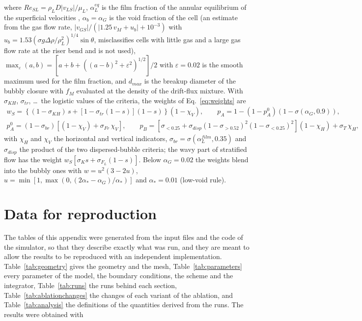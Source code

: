 \documentclass[a4paper,fleqn]{cas-sc}
\newcommand{\aG}{\alpha_G}
\newcommand{\aL}{\alpha_L}
\begin{document}
where $Re_{SL} = \rho_L D|v_{LS}|/\mu_L$, $\aL^{eq}$ is the film fraction of the annular equilibrium of the superficial velocities \citep{taitel1980,barnea1987}, $\alpha_b = \aG$ is the void fraction of the cell (an estimate from the gas flow rate, $|v_{GS}|/(|1.25\,v_M + u_b| + 10^{-3})$ with $u_b = 1.53(\sigma g\Delta\rho/\rho_L^2)^{1/4}\sin\theta$, misclassifies cells with little gas and a large gas flow rate at the riser bend and is not used), $\max_\varepsilon(a, b) = [a + b + ((a - b)^2 + \varepsilon^2)^{1/2}]/2$ with $\varepsilon = 0.02$ is the smooth maximum used for the film fraction, and $d_{max}$ is the breakup diameter of the bubbly closure with $f_M$ evaluated at the density of the drift-flux mixture. With $\sigma_{KH}$, $\sigma_{tr}$, \dots\ the logistic values of the criteria, the weights of Eq.~\eqref{eq:weights} are
\begin{gather}
w_S = \left\{(1 - \sigma_{KH})\,s + \left[1 - \sigma_{tr}(1 - s)\right](1 - s)\right\}(1 - \chi_V), \qquad p_A = 1 - (1 - p_A^0)(1 - \sigma(\aG, 0.9)), \\
p_A^0 = (1 - \sigma_{br})\left[(1 - \chi_V) + \sigma_{Fr}\,\chi_V\right], \qquad p_B = \left[\sigma_{<0.25} + \sigma_{disp}(1 - \sigma_{>0.52})^2(1 - \sigma_{<0.25})^2\right](1 - \chi_H) + \sigma_T\,\chi_H,
\end{gather}
with $\chi_H$ and $\chi_V$ the horizontal and vertical indicators, $\sigma_{br} = \sigma(\aL^{film}, 0.35)$ and $\sigma_{disp}$ the product of the two dispersed-bubble criteria; the wavy part of stratified flow has the weight $w_S[\sigma_K s + \sigma_{F_L}(1 - s)]$. Below $\aG = 0.02$ the weights blend into the bubbly ones with $w = u^2(3 - 2u)$, $u = \min[1, \max(0, (2\alpha_* - \aG)/\alpha_*)]$ and $\alpha_* = 0.01$ (low-void rule).

\section{Data for reproduction}\label{app:reproduction}
\setcounter{equation}{0}\setcounter{table}{0}\setcounter{figure}{0}

The tables of this appendix were generated from the input files and the code of the simulator, so that they describe exactly what was run, and they are meant to allow the results to be reproduced with an independent implementation. Table~\ref{tab:geometry} gives the geometry and the mesh, Table~\ref{tab:parameters} every parameter of the model, the boundary conditions, the scheme and the integrator, Table~\ref{tab:runs} the runs behind each section, Table~\ref{tab:ablationchanges} the changes of each variant of the ablation, and Table~\ref{tab:analysis} the definitions of the quantities derived from the runs. The results were obtained with 
\end{document}
